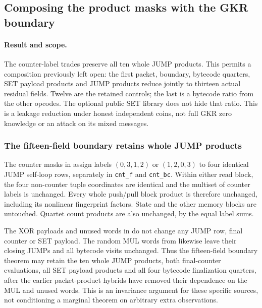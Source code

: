 \subsection{Composing the product masks with the GKR boundary}\label{note:zk-control-residual}

\paragraph{Result and scope.} The counter-label trades preserve all ten whole JUMP products. This permits a composition previously left open: the first packet, boundary, bytecode quarters, SET payload products and JUMP products reduce jointly to thirteen actual residual fields. Twelve are the retained controls; the last is a bytecode ratio from the other opcodes. The optional public SET library does not hide that ratio. This is a leakage reduction under honest independent coins, not full GKR zero knowledge or an attack on its mixed messages.

\subsubsection{The fifteen-field boundary retains whole JUMP products}

The counter masks in  assign labels $(0,3,1,2)$ or $(1,2,0,3)$ to four identical JUMP self-loop rows, separately in \texttt{cnt\_f} and \texttt{cnt\_bc}. Within either read block, the four non-counter tuple coordinates are identical and the multiset of counter labels is unchanged. Every whole push/pull block product is therefore unchanged, including its nonlinear fingerprint factors. State and the other memory blocks are untouched. Quartet count products are also unchanged, by the equal label sums.

The XOR payloads and unused words in  do not change any JUMP row, final counter or SET payload. The random MUL words from  likewise leave their closing JUMPs and all bytecode visits unchanged. Thus the fifteen-field boundary theorem may retain the ten whole JUMP products, both final-counter evaluations, all SET payload products and all four bytecode finalization quarters, after the earlier packet-product hybrids have removed their dependence on the MUL and unused words. This is an invariance argument for these specific sources, not conditioning a marginal theorem on arbitrary extra observations.

